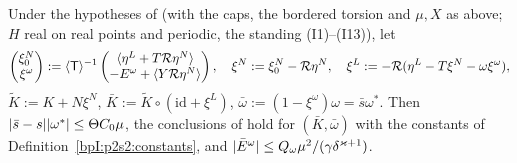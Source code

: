 \begin{proposition}\label{bpI:p2s2:step}
Under the hypotheses of  (with the caps, the bordered torsion and $\mu,X$ as above; $H$ real on real points and periodic, the
standing (I1)--(I13)), let
\[
\begin{pmatrix}\xi^N_0\\\xi^\omega\end{pmatrix}:=\langle \mathsf T\rangle^{-1}\begin{pmatrix}\langle \eta^L+T\mathcal R\eta^N\rangle\\-E^\omega+\langle Y\mathcal R\eta^N\rangle\end{pmatrix},\quad
\xi^N:=\xi^N_0-\mathcal R\eta^N,\quad\xi^L:=-\mathcal R(\eta^L-T\xi^N-\omega\xi^\omega),
\]
$\tilde K:=K+N\xi^N$, $\bar K:=\tilde K\circ(\mathrm{id}+\xi^L)$, $\bar\omega:=(1-\xi^\omega)\omega=\bar s\omega^*$. Then $\lvert \bar s-s\rvert\lvert \omega^*\rvert\le\Theta C_0\mu$, the conclusions of
 hold for $(\bar K,\bar\omega)$ with the constants of Definition~\ref{bpI:p2s2:constants}, and $\lvert \bar E^\omega\rvert\le Q_\omega\mu^2/(\gamma\delta^{\varkappa+1})$.
\end{proposition}

